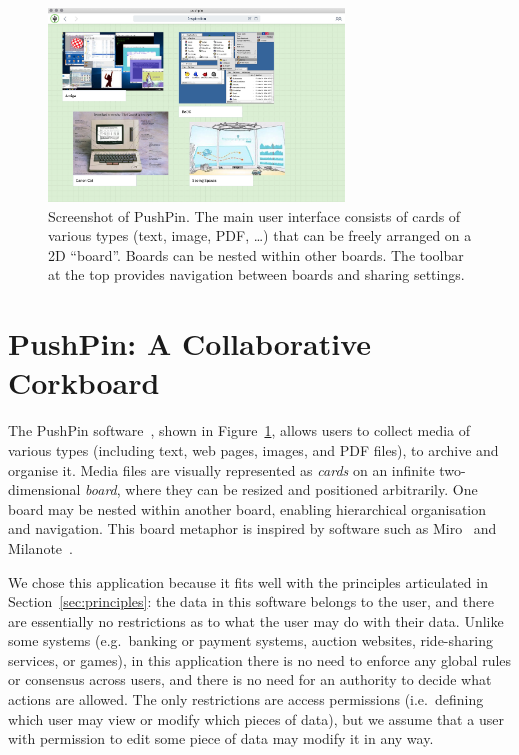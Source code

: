 \documentclass[sigplan,10pt]{acmart}
\begin{document}
\begin{figure}
    \centering
    \includegraphics[width=0.7\textwidth]{pushpin.jpg}
    \caption{Screenshot of PushPin. The main user interface consists of cards of various types (text, image, PDF, \dots) that can be freely arranged on a 2D ``board''. Boards can be nested within other boards. The toolbar at the top provides navigation between boards and sharing settings.}
    \label{fig:pushpin}
\end{figure}

\section{PushPin: A Collaborative Corkboard}\label{sec:pushpin}

The PushPin software~\cite{PushPinSource}, shown in Figure~\ref{fig:pushpin}, allows users to collect media of various types (including text, web pages, images, and PDF files), to archive and organise it.
Media files are visually represented as \emph{cards} on an infinite two-dimensional \emph{board}, where they can be resized and positioned arbitrarily.
One board may be nested within another board, enabling hierarchical organisation and navigation.
This board metaphor is inspired by software such as Miro~\cite{Miro} and Milanote~\cite{Milanote}.

We chose this application because it fits well with the principles articulated in Section~\ref{sec:principles}: the data in this software belongs to the user, and there are essentially no restrictions as to what the user may do with their data.
Unlike some systems (e.g.\ banking or payment systems, auction websites, ride-sharing services, or games), in this application there is no need to enforce any global rules or consensus across users, and there is no need for an authority to decide what actions are allowed.
The only restrictions are access permissions (i.e.\ defining which user may view or modify which pieces of data), but we assume that a user with permission to edit some piece of data may modify it in any way.
\end{document}
